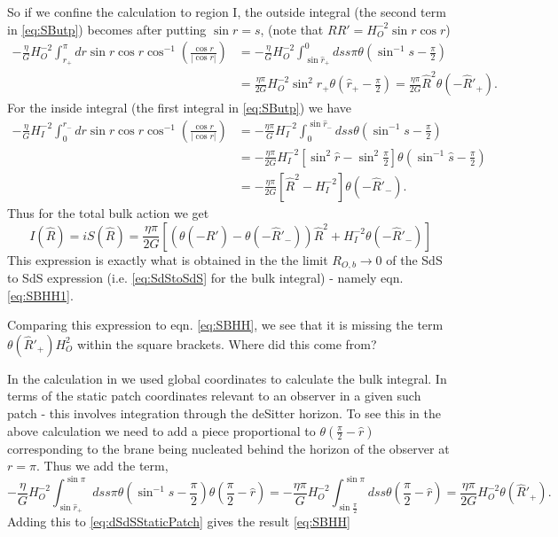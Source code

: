 \documentclass[a4paper,11pt]{article}
\numberwithin{equation}{section}
\newcommand{\citep}{\cite}
\numberwithin{equation}{section}
\begin{document}
So if we confine the calculation to region I, the outside integral
(the second term in \eqref{eq:SButp}) becomes after putting $\sin r=s$,
(note that $RR'=H_{O}^{-2}\sin r\cos r$)
\begin{align}
-\frac{\eta}{G}H_{O}^{-2}\int_{\hat{r}_{+}}^{\pi}dr\sin r\cos r\cos^{-1}\left(\frac{\cos r}{|\cos r|}\right) & =-\frac{\eta}{G}H_{O}^{-2}\int_{\sin\hat{r}_{+}}^{0}dss\pi\theta\left(\sin^{-1}s-\frac{\pi}{2}\right)\nonumber \\
 & =\frac{\eta\pi}{2G}H_{O}^{-2}\sin^{2}\hat{r}_{+}\theta\left(\hat{r}_{+}-\frac{\pi}{2}\right)=\frac{\eta\pi}{2G}\hat{R}^{2}\theta\left(-\hat{R}'_{+}\right).\label{eq:dSout}
\end{align}
For the inside integral (the first integral in \eqref{eq:SButp})
we have 
\begin{align}
-\frac{\eta}{G}H_{I}^{-2}\int_{0}^{\hat{r}_{-}}dr\sin r\cos r\cos^{-1}\left(\frac{\cos r}{|\cos r|}\right) & =-\frac{\eta\pi}{G}H_{I}^{-2}\int_{0}^{\sin\hat{r}_{-}}dss\theta\left(\sin^{-1}s-\frac{\pi}{2}\right)\nonumber \\
 & =-\frac{\eta\pi}{2G}H_{I}^{-2}\left[\sin^{2}\hat{r}-\sin^{2}\frac{\pi}{2}\right]\theta\left(\sin^{-1}\hat{s}-\frac{\pi}{2}\right)\nonumber \\
 & =-\frac{\eta\pi}{2G}\left[\hat{R}^{2}-H_{I}^{-2}\right]\theta\left(-\hat{R}'_{-}\right).\label{eq:dSin}
\end{align}
Thus for the total bulk action we get
\begin{equation}
I\left(\hat{R}\right)=iS\left(\hat{R}\right)=\frac{\eta\pi}{2G}\left[\left(\theta\left(-\hat{R}'\right)-\theta\left(-\hat{R}'_{-}\right)\right)\hat{R}^{2}+H_{I}^{-2}\theta\left(-\hat{R}'_{-}\right)\right]\label{eq:dSdSStaticPatch}
\end{equation}
This expression is exactly what is obtained in the the limit $R_{O,b}\rightarrow0$
of the SdS to SdS expression (i.e. \eqref{eq:SdStoSdS} for the bulk integral) - namely eqn. \eqref{eq:SBHH1}.

Comparing this expression to eqn. \eqref{eq:SBHH}, we see that it
is missing the term $\theta(\hat{R}'_{+})H_{O}^{2}$ within the square
brackets. Where did this come from? 

In the calculation in \citep{DeAlwis:2019rxg} we used global coordinates
to calculate the bulk integral. In terms of the static patch coordinates
relevant to an observer in a given such patch - this involves integration
through the deSitter horizon. To see this in the above calculation
we need to add a piece proportional to $\theta\left(\frac{\pi}{2}-\hat{r}\right)$
corresponding to the brane being nucleated behind the horizon of the
observer at $r=\pi$. Thus we add the term,
\begin{equation}
-\frac{\eta}{G}H_{O}^{-2}\int_{\sin\hat{r}_{+}}^{\sin\pi}dss\pi\theta\left(\sin^{-1}s-\frac{\pi}{2}\right)\theta\left(\frac{\pi}{2}-\hat{r}\right)=-\frac{\eta\pi}{G}H_{O}^{-2}\int_{\sin\frac{\pi}{2}}^{\sin\pi}dss\theta\left(\frac{\pi}{2}-\hat{r}\right)=\frac{\eta\pi}{2G}H_{O}^{-2}\theta\left(\hat{R}'_{+}\right).\label{eq:dSOadd}
\end{equation}
Adding this to \eqref{eq:dSdSStaticPatch} gives the result \eqref{eq:SBHH}
\end{document}
